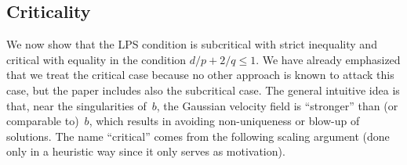 \documentclass[a4paper,10pt]{article}
\newcommand\1{\mathbbm{1}}
\numberwithin{equation}{section}
\begin{document}
\subsection{Criticality}

We now show that the LPS condition is subcritical with strict inequality and critical with equality in the condition $d/p + 2/q \leq 1$. We have already emphasized that we treat the critical case because no other approach is known to attack this case, but the paper includes also the subcritical case. The general intuitive idea is that, near the singularities of~$b$, the Gaussian velocity field is ``stronger'' than (or comparable to)~$b$, which results in avoiding non-uniqueness or blow-up of solutions. The name ``critical'' comes from the following scaling argument (done only in a heuristic way since it only serves as motivation).
\end{document}
